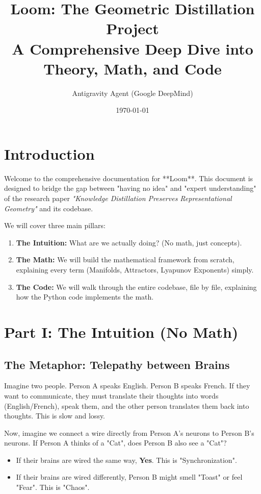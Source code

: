 \documentclass[11pt,a4paper]{article}
\title{\textbf{Loom: The Geometric Distillation Project} \\ \Large A Comprehensive Deep Dive into Theory, Math, and Code}
\author{Antigravity Agent (Google DeepMind)}
\date{\today}
\begin{document}
\maketitle
\tableofcontents
\newpage

\section{Introduction}
Welcome to the comprehensive documentation for **Loom**. This document is designed to bridge the gap between "having no idea" and "expert understanding" of the research paper \textit{"Knowledge Distillation Preserves Representational Geometry"} and its codebase.

We will cover three main pillars:
\begin{enumerate}
    \item \textbf{The Intuition:} What are we actually doing? (No math, just concepts).
    \item \textbf{The Math:} We will build the mathematical framework from scratch, explaining every term (Manifolds, Attractors, Lyapunov Exponents) simply.
    \item \textbf{The Code:} We will walk through the entire codebase, file by file, explaining how the Python code implements the math.
\end{enumerate}

\section{Part I: The Intuition (No Math)}

\subsection{The Metaphor: Telepathy between Brains}
Imagine two people. Person A speaks English. Person B speaks French. If they want to communicate, they must translate their thoughts into words (English/French), speak them, and the other person translates them back into thoughts. This is slow and lossy.

Now, imagine we connect a wire directly from Person A's neurons to Person B's neurons. If Person A thinks of a "Cat", does Person B also see a "Cat"?
\begin{itemize}
    \item If their brains are wired the same way, \textbf{Yes}. This is "Synchronization".
    \item If their brains are wired differently, Person B might smell "Toast" or feel "Fear". This is "Chaos".
\end{itemize}
\end{document}
